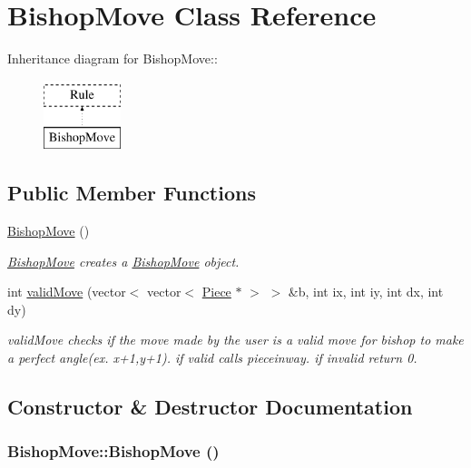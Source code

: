 \hypertarget{classBishopMove}{
\section{BishopMove Class Reference}
\label{classBishopMove}
}
Inheritance diagram for BishopMove::\begin{figure}[H]
\begin{center}
\leavevmode
\includegraphics[height=2cm]{classBishopMove}
\end{center}
\end{figure}
\subsection*{Public Member Functions}
\begin{DoxyCompactItemize}
\item 
\hyperlink{classBishopMove_aa066339d2be626d650a7edde5d5ecfc1}{BishopMove} ()
\begin{DoxyCompactList}\small\item\em \hyperlink{classBishopMove}{BishopMove} creates a \hyperlink{classBishopMove}{BishopMove} object. \item\end{DoxyCompactList}\item 
int \hyperlink{classBishopMove_a30929c42136a677d9531d21696fd2c82}{validMove} (vector$<$ vector$<$ \hyperlink{classPiece}{Piece} $\ast$ $>$ $>$ \&b, int ix, int iy, int dx, int dy)
\begin{DoxyCompactList}\small\item\em validMove checks if the move made by the user is a valid move for bishop to make a perfect angle(ex. x+1,y+1). if valid calls pieceinway. if invalid return 0. \item\end{DoxyCompactList}\end{DoxyCompactItemize}


\subsection{Constructor \& Destructor Documentation}
\hypertarget{classBishopMove_aa066339d2be626d650a7edde5d5ecfc1}{
\subsubsection[{BishopMove}]{\setlength{\rightskip}{0pt plus 5cm}BishopMove::BishopMove ()}}
\label{classBishopMove_aa066339d2be626d650a7edde5d5ecfc1}


